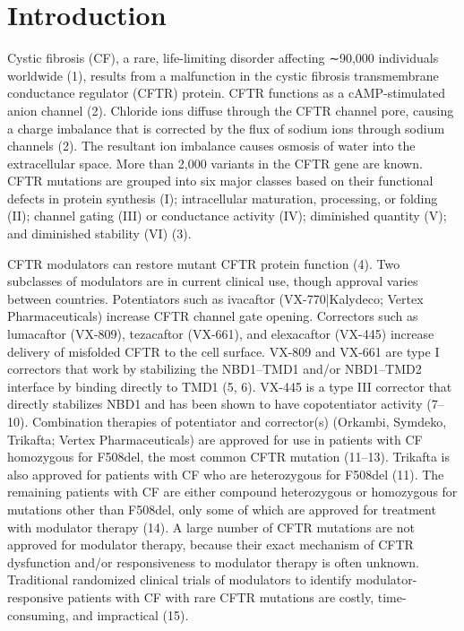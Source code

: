 \section{Introduction}
Cystic fibrosis (CF), a rare, life-limiting disorder affecting ∼90,000 individuals worldwide (1), results from a malfunction in the cystic fibrosis transmembrane conductance regulator (CFTR) protein. CFTR functions as a cAMP-stimulated anion channel (2). Chloride ions diffuse through the CFTR channel pore, causing a charge imbalance that is corrected by the flux of sodium ions through sodium channels (2). The resultant ion imbalance causes osmosis of water into the extracellular space. More than 2,000 variants in the CFTR gene are known. CFTR mutations are grouped into six major classes based on their functional defects in protein synthesis (I); intracellular maturation, processing, or folding (II); channel gating (III) or conductance activity (IV); diminished quantity (V); and diminished stability (VI) (3).

CFTR modulators can restore mutant CFTR protein function (4). Two subclasses of modulators are in current clinical use, though approval varies between countries. Potentiators such as ivacaftor (VX-770|Kalydeco; Vertex Pharmaceuticals) increase CFTR channel gate opening. Correctors such as lumacaftor (VX-809), tezacaftor (VX-661), and elexacaftor (VX-445) increase delivery of misfolded CFTR to the cell surface. VX-809 and VX-661 are type I correctors that work by stabilizing the NBD1–TMD1 and/or NBD1–TMD2 interface by binding directly to TMD1 (5, 6). VX-445 is a type III corrector that directly stabilizes NBD1 and has been shown to have copotentiator activity (7–10). Combination therapies of potentiator and corrector(s) (Orkambi, Symdeko, Trikafta; Vertex Pharmaceuticals) are approved for use in patients with CF homozygous for F508del, the most common CFTR mutation (11–13). Trikafta is also approved for patients with CF who are heterozygous for F508del (11). The remaining patients with CF are either compound heterozygous or homozygous for mutations other than F508del, only some of which are approved for treatment with modulator therapy (14). A large number of CFTR mutations are not approved for modulator therapy, because their exact mechanism of CFTR dysfunction and/or responsiveness to modulator therapy is often unknown. Traditional randomized clinical trials of modulators to identify modulator-responsive patients with CF with rare CFTR mutations are costly, time-consuming, and impractical (15).

